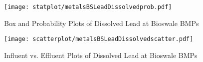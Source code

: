         \begin{figure}[hb]   %
            \centering
            \texttt{[image: statplot/metalsBSLeadDissolvedprob.pdf]}
            \caption{Box and Probability Plots of Dissolved Lead at Bioswale BMPs}
        \end{figure}         %
        
        
        \begin{figure}[hb]   %
            \centering
            \texttt{[image: scatterplot/metalsBSLeadDissolvedscatter.pdf]}
            \caption{Influent vs. Effluent Plots of Dissolved Lead at Bioswale BMPs}
        \end{figure}         %
        \clearpage
        